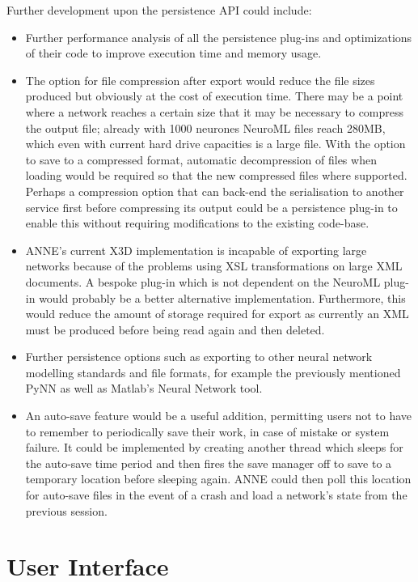 \documentclass{acm_proc_article-sp}
\begin{document}
{Further development upon the persistence API could include:
\begin{itemize}
\item {
Further performance analysis of all the persistence plug{}-ins and optimizations of their code to improve execution time and memory usage.
}
\item {
The option for file compression after export would reduce the file sizes produced but obviously at the cost of execution time. There may be a point where a network reaches a certain size that it may be necessary to compress the output file; already with 1000 neurones NeuroML files reach 280MB, which even with current hard drive capacities is a large file. With the option to save to a compressed format, automatic decompression of files when loading would be required so that the new compressed files where supported. Perhaps a compression option that can back{}-end the serialisation to another service first before compressing its output could be a persistence plug{}-in to enable this without requiring modifications to the existing code{}-base.
}
\item {
ANNE's current X3D implementation is incapable of exporting large networks because of the problems using XSL transformations on large XML documents. A bespoke plug{}-in which is not dependent on the NeuroML plug{}-in would probably be a better alternative implementation. Furthermore, this would reduce the amount of storage required for export as currently an XML must be produced before being read again and then deleted.
}
\item {
Further persistence options such as exporting to other neural network modelling standards and file formats, for example the previously mentioned PyNN as well as Matlab's Neural Network tool.
}
\item {
An auto{}-save feature would be a useful addition, permitting users not to have to remember to periodically save their work, in case of mistake or system failure. It could be implemented by creating another thread which sleeps for the auto{}-save time period and then fires the save manager off to save to a temporary location before sleeping again. ANNE could then poll this location for auto-save files in the event of a crash and load a network's state from the previous session.
}
\end{itemize}
}

\section{User Interface}
\end{document}

